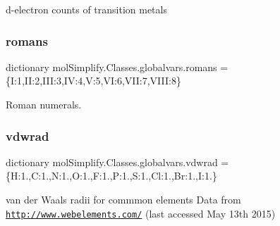 d-\/electron counts of transition metals 

\mbox{\label{namespacemolSimplify_1_1Classes_1_1globalvars_a3548f27e4e3159bbb6d8ff08c0437a00}} 
\subsubsection{\texorpdfstring{romans}{romans}}
{\footnotesize\ttfamily dictionary mol\+Simplify.\+Classes.\+globalvars.\+romans = \{\textquotesingle{}I\textquotesingle{}\+:\textquotesingle{}1\textquotesingle{},\textquotesingle{}II\textquotesingle{}\+:\textquotesingle{}2\textquotesingle{},\textquotesingle{}I\+II\textquotesingle{}\+:\textquotesingle{}3\textquotesingle{},\textquotesingle{}IV\textquotesingle{}\+:\textquotesingle{}4\textquotesingle{},\textquotesingle{}V\textquotesingle{}\+:\textquotesingle{}5\textquotesingle{},\textquotesingle{}VI\textquotesingle{}\+:\textquotesingle{}6\textquotesingle{},\textquotesingle{}V\+II\textquotesingle{}\+:\textquotesingle{}7\textquotesingle{},\textquotesingle{}V\+I\+II\textquotesingle{}\+:\textquotesingle{}8\textquotesingle{}\}}



Roman numerals. 

\mbox{\label{namespacemolSimplify_1_1Classes_1_1globalvars_a86110c75ee87bdc8a8d452c9a090ba23}} 
\subsubsection{\texorpdfstring{vdwrad}{vdwrad}}
{\footnotesize\ttfamily dictionary mol\+Simplify.\+Classes.\+globalvars.\+vdwrad = \{\textquotesingle{}H\textquotesingle{}\+:1.,\textquotesingle{}C\textquotesingle{}\+:1.,\textquotesingle{}N\textquotesingle{}\+:1.,\textquotesingle{}O\textquotesingle{}\+:1.,\textquotesingle{}F\textquotesingle{}\+:1.,\textquotesingle{}P\textquotesingle{}\+:1.,\textquotesingle{}S\textquotesingle{}\+:1.,\textquotesingle{}Cl\textquotesingle{}\+:1.,\textquotesingle{}Br\textquotesingle{}\+:1.,\textquotesingle{}I\textquotesingle{}\+:1.\}}



van der Waals radii for commmon elements Data from \href{http://www.webelements.com/}{\tt http\+://www.\+webelements.\+com/} (last accessed May 13th 2015) 

